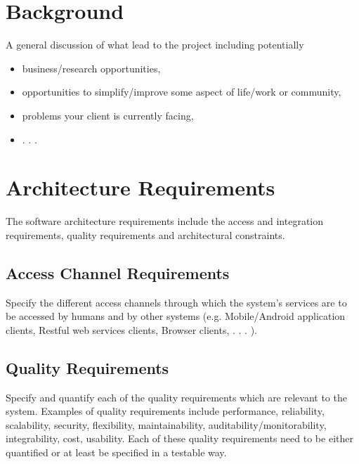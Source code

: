 \documentclass[a4paper,12pt]{article}
\begin{document}
\section{Background}

A general discussion of what lead to the project including potentially
\begin{itemize}
\item business/research opportunities,
\item opportunities to simplify/improve some aspect of life/work or community,
\item problems your client is currently facing,
\item . . .
\end{itemize}

\section{Architecture Requirements}

The software architecture requirements include the access and integration requirements, quality
requirements and architectural constraints.

\subsection{Access Channel Requirements}

Specify the different access channels through which the system's services are to be accessed by
humans and by other systems (e.g. Mobile/Android application clients, Restful web services
clients, Browser clients, . . . ).

\subsection{Quality Requirements}

Specify and quantify each of the quality requirements which are relevant to the system. Examples of quality requirements include performance, reliability, scalability, security, 
flexibility,
maintainability, auditability/monitorability, integrability, cost, usability. Each of these quality
requirements need to be either quantified or at least be specified in a testable way.
\end{document}
